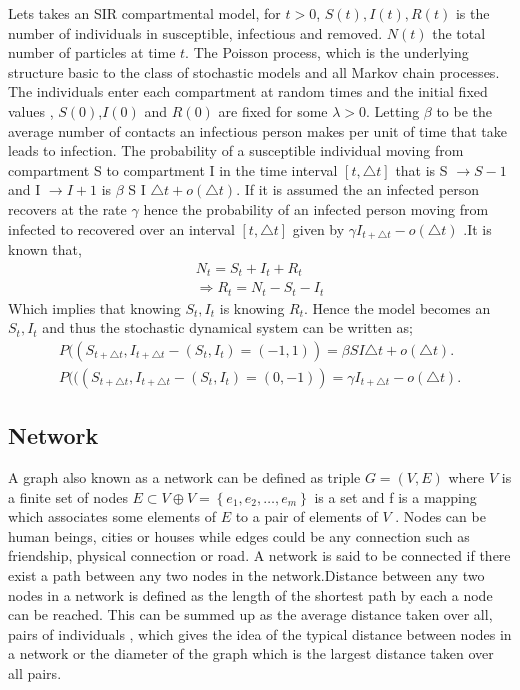  Lets takes an SIR compartmental model, for $t > 0$, $S(t),I(t),R(t)$ is the number of individuals in susceptible, infectious and removed. $N(t)$ the total number of particles at time $t$. The Poisson process, which is the underlying structure basic to the class of stochastic models and all Markov chain processes\citep{greenwood2009stochastic}. The individuals enter each compartment at random times and the initial fixed values , $S(0)$,$I(0)$ and $R(0)$ are fixed for some $\lambda > 0$. Letting $\beta$ to be the average number of  contacts an infectious person makes per unit of time that take leads to infection. The probability of a susceptible individual moving from compartment S to compartment I in the time interval $\left[ t,\triangle t \right]$ that is  S $\rightarrow S-1$ and I $\rightarrow I + 1 $ is $ \beta$ S I $ \triangle t + o (\triangle t)$. If it is assumed the an infected person recovers at the rate $\gamma$ hence the probability of an infected person moving from infected to recovered over an interval $\left[ t,\triangle t \right]$  given by $\gamma I_{t + \triangle t} -o (\triangle t)$ .It is known that,
 \begin{align*}
 N_t = S_t + I_t + R_t
 \\ \Rightarrow  R_t = N_t - S_t - I_t
\end{align*}  
Which implies that knowing $S_t,I_t$ is knowing $R_t$. Hence the model becomes an $S_t,I_t$ and thus the stochastic dynamical system can be written as;
 \begin{align}
 P((S_{t + \triangle t}, I_{t + \triangle t} - (S_t ,I_t) = ( - 1,1)) =  \beta S I  \triangle t + o (\triangle t).
 \\ P (((S_{t + \triangle t}, I_{t + \triangle t} - (S_t ,I_t) = ( 0,-1)) = \gamma I_{t + \triangle t} -o (\triangle t).
 \end{align}
\subsection{Network}


 A graph also known as a network   can be  defined as triple $G = (V,E)$ where $V$ is a finite set of nodes $E \subset V \oplus V = \left\lbrace e_1,e_2,\dots ,e_m \right\rbrace$ is a set and f is a mapping which associates some elements of $E$ to a pair of elements of $V$ \citep{estrada2012structure}. Nodes can be human beings, cities or houses while edges could be any connection such as friendship, physical connection or road.
 A network is said to be connected if there exist a path between any two nodes in the network.Distance between any two nodes in a network is defined as the length of the shortest path by each a node can be reached. This can be summed up as the average distance taken over all, pairs of individuals , which gives the idea of the typical distance between nodes in a network or the diameter of the graph which is the largest distance taken over all pairs.
